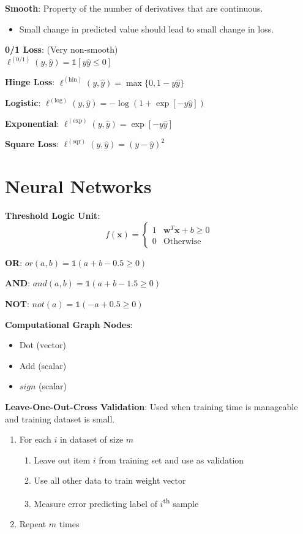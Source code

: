 \documentclass[10pt]{article}
\begin{document}
\begin{multicols}{3}
  \textbf{Smooth}: Property of the number of derivatives that are continuous.
  \begin{itemize}
    \item Small change in predicted value should lead to small change in loss.
  \end{itemize}

  \textbf{0/1 Loss}: (Very non-smooth)\\
  $ \ell^{(\text{0/1})}(y,\hat{y}) = \mathbb{1}[y\hat{y} \leq 0] $

  \textbf{Hinge Loss}:
  $ \ell^{(\text{hin})}(y,\hat{y}) = \max\{0, 1-y\hat{y}\} $

  \textbf{Logistic}:
  $ \ell^{(\text{log})}(y,\hat{y}) = -\log(1+\exp[-y\hat{y}]) $

  \textbf{Exponential}:
  $ \ell^{(\text{exp})}(y,\hat{y}) = \exp[-y\hat{y}] $

  \textbf{Square Loss}:
  $ \ell^{(\text{sqr})}(y,\hat{y}) = (y - \hat{y})^{2} $

  \section{Neural Networks}

  \textbf{Threshold Logic Unit}:
  \vspace{-4pt}
  \[ f(\mathbf{x}) = \begin{cases}
                          1 & \mathbf{w}^{T}\mathbf{x} + b \geq 0 \\
                          0 & \text{Otherwise}
                      \end{cases} \]

  \textbf{OR}: $or(a,b) =\mathbb{1}(a + b -0.5\geq0)$

  \vspace{6pt}\textbf{AND}: $and(a,b) =\mathbb{1}(a + b -1.5\geq0)$

  \vspace{6pt}\textbf{NOT}: $not(a) =\mathbb{1}(-a + 0.5\geq0)$

  \textbf{Computational Graph Nodes}:
  \begin{itemize}
    \item Dot (vector)
    \item Add (scalar)
    \item $sign$ (scalar)
  \end{itemize}

  \textbf{Leave-One-Out-Cross Validation}: Used when training time is manageable and training dataset is small.
  \begin{enumerate}
    \item For each $i$ in dataset of size $m$
      \begin{enumerate}
        \item Leave out item $i$ from training set and use as validation
        \item Use all other data to train weight vector
        \item Measure error predicting label of $i$\textsuperscript{th} sample
      \end{enumerate}
    \item Repeat $m$ times
  \end{enumerate}


\end{multicols}
\end{document}
